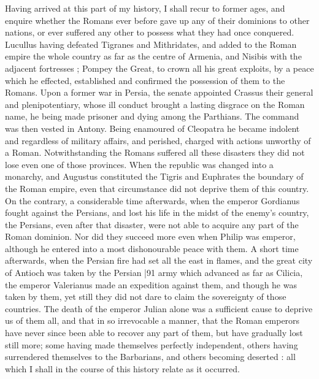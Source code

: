 Having arrived at this part of my history, I shall recur to former ages, and enquire whether the Romans ever before gave up any of their dominions to other nations, or ever suffered any other to possess what they had once conquered. Lucullus having defeated Tigranes and Mithridates, and added to the Roman empire the whole country as far as the centre of Armenia, and Nisibis with the adjacent fortresses ; Pompey the Great, to crown all his great exploits, by a peace which he effected, established and confirmed the possession of them to the Romans. Upon a former war in Persia, the senate appointed Crassus their general and plenipotentiary, whose ill conduct brought a lasting disgrace on the Roman name, he being made prisoner and dying among the Parthians. The command was then vested in Antony. Being enamoured of Cleopatra he became indolent and regardless of military affairs, and perished, charged with actions unworthy of a Roman. Notwithstanding the Romans suffered all these disasters they did not lose even one of those provinces. When the republic was changed into a monarchy, and Augustus constituted the Tigris and Euphrates the boundary of the Roman empire, even that circumstance did not deprive them of this country. On the contrary, a considerable time afterwards, when the emperor Gordianus fought against the Persians, and lost his life in the midst of the enemy's country, the Persians, even after that disaster, were not able to acquire any part of the Roman dominion. Nor did they succeed more even when Philip was emperor, although he entered into a most dishonourable peace with them. A short time afterwards, when the Persian fire had set all the east in flames, and the great city of Antioch was taken by the Persian
|91 army which advanced as far as Cilicia, the emperor Valerianus made an expedition against them, and though he was taken by them, yet still they did not dare to claim the sovereignty of those countries. The death of the emperor Julian alone was a sufficient cause to deprive us of them all, and that in so irrevocable a manner, that the Roman emperors have never since been able to recover any part of them, but have gradually lost still more; some having made themselves perfectly independent, others having surrendered themselves to the Barbarians, and others becoming deserted : all which I shall in the course of this history relate as it occurred.

